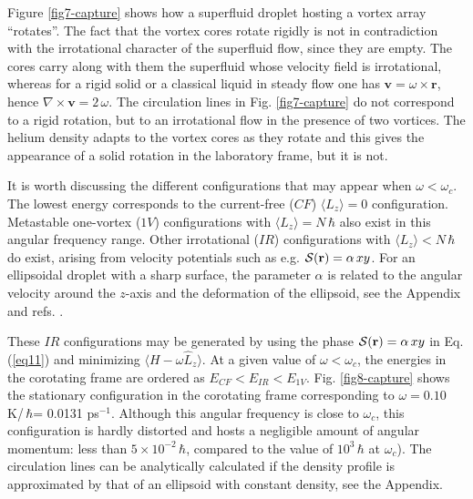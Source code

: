 Figure \ref{fig7-capture} shows how a superfluid droplet 
hosting a vortex array ``rotates''. The fact that the vortex 
cores rotate rigidly is not in 
contradiction with the irrotational character 
of the superfluid flow, since they are empty.  The cores carry 
along with them the superfluid whose velocity field  is irrotational,
whereas for a rigid solid or a classical liquid in steady flow 
 one has $\mathbf{v} = \omega \times \mathbf{r}$,  hence $\nabla \times \mathbf{v} = 2\, \omega$. 
The circulation lines in Fig. \ref{fig7-capture} do not correspond 
to a rigid rotation, but to  an irrotational flow in the presence of two vortices. 
The helium density adapts to the vortex cores as they 
rotate and this gives the appearance of a solid 
rotation in the laboratory frame, but it is not. 

It is worth discussing the different  configurations 
that may appear when $\omega < \omega_c$. The lowest energy  
corresponds to the current-free ($CF$) $\langle L_z \rangle =0$ configuration. 
Metastable one-vortex ($1V$) configurations  with 
$\langle L_z \rangle  =N \, \hbar$ also exist in this 
angular frequency range.\citep{Anc14,Anc15} Other irrotational ($IR$) configurations
with $\langle L_z \rangle   < N \, \hbar$ do exist, arising  
from  velocity potentials  such as e.g. 
${\cal S}(\mathbf{r}) = \alpha \,xy$. For an  ellipsoidal droplet with a sharp 
surface, the parameter $\alpha$ is related to the 
angular velocity around the $z$-axis and the deformation 
of the ellipsoid, see the Appendix and refs. \citep{Sei94,Boh75,Rec01}. 

These $IR$ configurations may be generated by using  
the phase ${\cal S}(\mathbf{r}) = \alpha \,xy$ in  
Eq. (\ref{eq11}) and minimizing $\langle H - \omega \hat{L}_z \rangle$. 
At a given value of $\omega < \omega_c$, the energies in the 
corotating frame  are ordered as $E_{CF} < E_{IR} < E_{1V}$.
Fig. \ref{fig8-capture} shows the stationary configuration in the 
corotating frame corresponding to  $\omega= 0.10$ K/\,$\hbar$= 0.0131 ps$^{-1}$.
Although this angular frequency is close to  $\omega_c$,
this configuration is hardly distorted and hosts a negligible amount
of angular momentum: less than $5\times 10^{-2}  \, \hbar$,  compared to the value  of $10^3 \,  \hbar$ at $\omega_c$). The circulation lines 
can be analytically calculated if the density 
profile is approximated by that of an ellipsoid with constant density, see the Appendix. 
 
